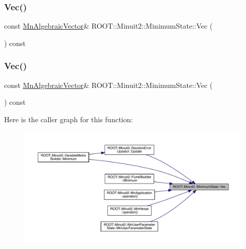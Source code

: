 \mbox{\label{classROOT_1_1Minuit2_1_1MinimumState_a0c7ad9c9226473f87b1bbb15ed87bbcd}} 
\subsubsection{\texorpdfstring{Vec()}{Vec()}\hspace{0.1cm}{\footnotesize\ttfamily [2/3]}}
{\footnotesize\ttfamily const \mbox{\hyperlink{namespaceROOT_1_1Minuit2_a62ed97730a1ca8d3fbaec64a19aa11c9}{Mn\+Algebraic\+Vector}}\& R\+O\+O\+T\+::\+Minuit2\+::\+Minimum\+State\+::\+Vec (\begin{DoxyParamCaption}{ }\end{DoxyParamCaption}) const\hspace{0.3cm}{\ttfamily [inline]}}

\mbox{\label{classROOT_1_1Minuit2_1_1MinimumState_a0c7ad9c9226473f87b1bbb15ed87bbcd}} 
\subsubsection{\texorpdfstring{Vec()}{Vec()}\hspace{0.1cm}{\footnotesize\ttfamily [3/3]}}
{\footnotesize\ttfamily const \mbox{\hyperlink{namespaceROOT_1_1Minuit2_a62ed97730a1ca8d3fbaec64a19aa11c9}{Mn\+Algebraic\+Vector}}\& R\+O\+O\+T\+::\+Minuit2\+::\+Minimum\+State\+::\+Vec (\begin{DoxyParamCaption}{ }\end{DoxyParamCaption}) const\hspace{0.3cm}{\ttfamily [inline]}}

Here is the caller graph for this function\+:
\nopagebreak
\begin{figure}[H]
\begin{center}
\leavevmode
\includegraphics[width=350pt]{db/dcd/classROOT_1_1Minuit2_1_1MinimumState_a0c7ad9c9226473f87b1bbb15ed87bbcd_icgraph}
\end{center}
\end{figure}


